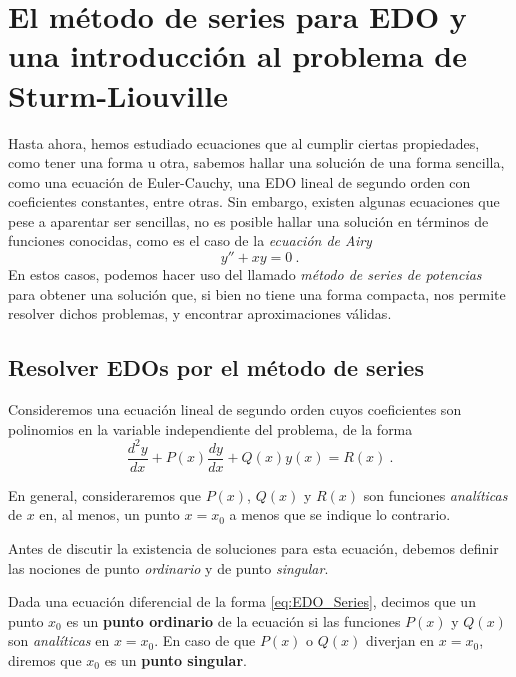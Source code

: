 \chapter{El método de series para EDO y una introducción al problema de Sturm-Liouville} \label{cap:series-sl}

Hasta ahora, hemos estudiado ecuaciones que al cumplir ciertas propiedades, como tener una forma u otra, sabemos hallar una solución de una forma sencilla, como una ecuación de Euler-Cauchy, una EDO lineal de segundo orden con coeficientes constantes, entre otras. Sin embargo, existen algunas ecuaciones que pese a aparentar ser sencillas, no es posible hallar una solución en términos de funciones conocidas, como es el caso de la \emph{ecuación de Airy}
\begin{equation}
    y'' + xy = 0 \ .
\end{equation}
En estos casos, podemos hacer uso del llamado \emph{método de series de potencias} para obtener una solución que, si bien no tiene una forma compacta, nos permite resolver dichos problemas, y encontrar aproximaciones válidas.

\section{Resolver EDOs por el método de series}

Consideremos una ecuación lineal de segundo orden cuyos coeficientes son polinomios en la variable independiente del problema, de la forma
\begin{equation} \label{eq:EDO_Series}
    \frac{d^2 y}{dx} + P(x) \frac{dy}{dx} + Q(x) y(x) = R(x) \ .
\end{equation}

En general, consideraremos que $P(x)$, $Q(x)$ y $R(x)$ son funciones \emph{analíticas} de $x$ en, al menos, un punto $x=x_0$ a menos que se indique lo contrario.

Antes de discutir la existencia de soluciones para esta ecuación, debemos definir las nociones de punto \emph{ordinario} y de punto \emph{singular}.

\begin{defi}
    Dada una ecuación diferencial de la forma \eqref{eq:EDO_Series}, decimos que un punto $x_0$ es un \textbf{punto ordinario} de la ecuación si las funciones $P(x)$ y $Q(x)$ son \emph{analíticas} en $x=x_0$. En caso de que $P(x)$ o $Q(x)$ diverjan en $x = x_0$, diremos que $x_0$ es un \textbf{punto singular}. 
\end{defi}


